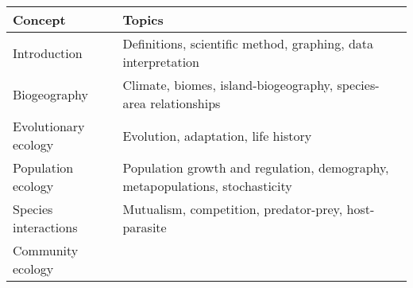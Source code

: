 \documentclass[]{article}
\begin{document}
\begin{longtable}[]{@{}ll@{}}
\toprule
\begin{minipage}[b]{0.17\columnwidth}\raggedright\strut
Concept\strut
\end{minipage} & \begin{minipage}[b]{0.78\columnwidth}\raggedright\strut
Topics\strut
\end{minipage}\tabularnewline
\midrule
\endhead
\begin{minipage}[t]{0.17\columnwidth}\raggedright\strut
Introduction\strut
\end{minipage} & \begin{minipage}[t]{0.78\columnwidth}\raggedright\strut
Definitions, scientific method, graphing, data interpretation\strut
\end{minipage}\tabularnewline
\begin{minipage}[t]{0.17\columnwidth}\raggedright\strut
Biogeography\strut
\end{minipage} & \begin{minipage}[t]{0.78\columnwidth}\raggedright\strut
Climate, biomes, island-biogeography, species-area relationships\strut
\end{minipage}\tabularnewline
\begin{minipage}[t]{0.17\columnwidth}\raggedright\strut
Evolutionary ecology\strut
\end{minipage} & \begin{minipage}[t]{0.78\columnwidth}\raggedright\strut
Evolution, adaptation, life history\strut
\end{minipage}\tabularnewline
\begin{minipage}[t]{0.17\columnwidth}\raggedright\strut
Population ecology\strut
\end{minipage} & \begin{minipage}[t]{0.78\columnwidth}\raggedright\strut
Population growth and regulation, demography, metapopulations,
stochasticity\strut
\end{minipage}\tabularnewline
\begin{minipage}[t]{0.17\columnwidth}\raggedright\strut
Species interactions\strut
\end{minipage} & \begin{minipage}[t]{0.78\columnwidth}\raggedright\strut
Mutualism, competition, predator-prey, host-parasite\strut
\end{minipage}\tabularnewline
\begin{minipage}[t]{0.17\columnwidth}\raggedright\strut
Community ecology\strut
\end{minipage} & \begin{minipage}[t]{0.78\columnwidth}\raggedright\strut

\end{minipage}
\end{longtable}
\end{document}
